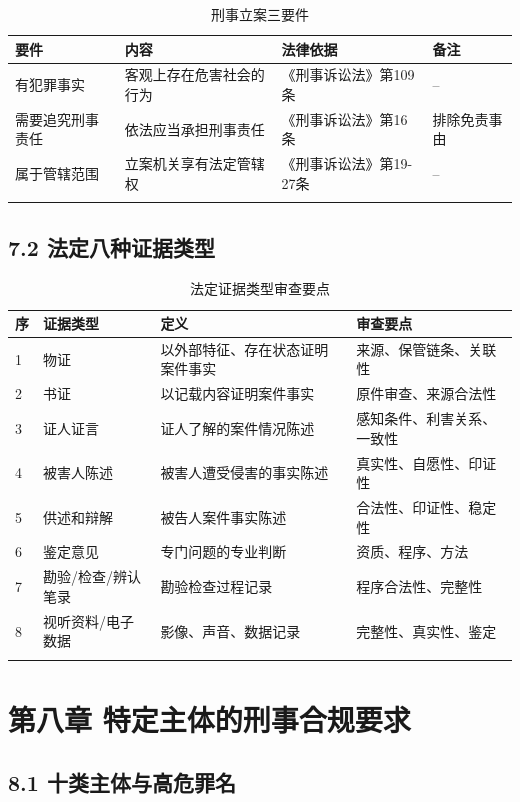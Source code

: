 \documentclass[12pt,a4paper]{article}
\begin{document}
\begin{longtable}{p{2cm}p{5cm}p{4cm}p{2cm}}
  \toprule
  \textbf{要件} & \textbf{内容} & \textbf{法律依据} & 备注 \\
  \midrule
  有犯罪事实 & 客观上存在危害社会的行为 & 《刑事诉讼法》第109条 & -- \\
  需要追究刑事责任 & 依法应当承担刑事责任 & 《刑事诉讼法》第16条 & 排除免责事由 \\
  属于管辖范围 & 立案机关享有法定管辖权 & 《刑事诉讼法》第19-27条 & -- \\
  \bottomrule
  \caption{刑事立案三要件}
\end{longtable}

\subsection{7.2 法定八种证据类型}

\begin{longtable}{p{0.5cm}p{3cm}p{4cm}p{5cm}}
  \toprule
  \textbf{序} & \textbf{证据类型} & \textbf{定义} & \textbf{审查要点} \\
  \midrule
  1 & 物证 & 以外部特征、存在状态证明案件事实 & 来源、保管链条、关联性 \\
  2 & 书证 & 以记载内容证明案件事实 & 原件审查、来源合法性 \\
  3 & 证人证言 & 证人了解的案件情况陈述 & 感知条件、利害关系、一致性 \\
  4 & 被害人陈述 & 被害人遭受侵害的事实陈述 & 真实性、自愿性、印证性 \\
  5 & 供述和辩解 & 被告人案件事实陈述 & 合法性、印证性、稳定性 \\
  6 & 鉴定意见 & 专门问题的专业判断 & 资质、程序、方法 \\
  7 & 勘验/检查/辨认笔录 & 勘验检查过程记录 & 程序合法性、完整性 \\
  8 & 视听资料/电子数据 & 影像、声音、数据记录 & 完整性、真实性、鉴定 \\
  \bottomrule
  \caption{法定证据类型审查要点}
\end{longtable}

\clearpage

\section{第八章 特定主体的刑事合规要求}

\subsection{8.1 十类主体与高危罪名}
\end{document}

